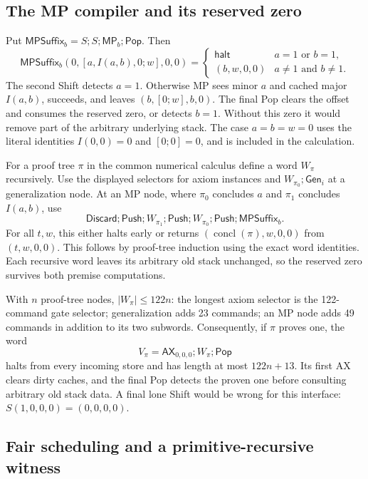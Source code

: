 \subsection{The MP compiler and its reserved zero}

Put $\mathsf{MPSuffix}_b=S;S;\mathsf{MP}_b;\mathsf{Pop}$. Then
\[
 \mathsf{MPSuffix}_b(0,[a,I(a,b),0;w],0,0)=
 \begin{cases}\mathsf{halt}&a=1\text{ or }b=1,\\
 (b,w,0,0)&a\ne1\text{ and }b\ne1.
 \end{cases}
\]
The second Shift detects $a=1$. Otherwise MP sees minor $a$ and cached
major $I(a,b)$, succeeds, and leaves $(b,[0;w],b,0)$. The final Pop
clears the offset and consumes the reserved zero, or detects $b=1$.
Without this zero it would remove part of the arbitrary underlying stack.
The case $a=b=w=0$ uses the literal identities $I(0,0)=0$ and $[0;0]=0$,
and is included in the calculation.

For a proof tree $\pi$ in the common numerical calculus define a word
$W_\pi$ recursively. Use the displayed selectors for axiom instances and
$W_{\pi_0};\mathsf{Gen}_i$ at a generalization node. At an MP node,
where $\pi_0$ concludes $a$ and $\pi_1$ concludes $I(a,b)$, use
\[
 \mathsf{Discard};\mathsf{Push};
 W_{\pi_1};\mathsf{Push};W_{\pi_0};\mathsf{Push};\mathsf{MPSuffix}_b.
\]
For all $t,w$, this either halts early or returns
$(\operatorname{concl}(\pi),w,0,0)$ from $(t,w,0,0)$.
This follows by proof-tree induction using the exact word identities.
Each recursive word leaves its arbitrary old stack unchanged, so the
reserved zero survives both premise computations.

With $n$ proof-tree nodes, $|W_\pi|\le122n$: the longest axiom selector
is the 122-command gate selector; generalization adds 23 commands; an
MP node adds 49 commands in addition to its two subwords. Consequently,
if $\pi$ proves one, the word
\[
 V_\pi=\mathsf{AX}_{0,0,0};W_\pi;\mathsf{Pop}
\]
halts from every incoming store and has length at most $122n+13$.
Its first AX clears dirty caches, and the final Pop detects the proven
one before consulting arbitrary old stack data. A final lone Shift would
be wrong for this interface: $S(1,0,0,0)=(0,0,0,0)$.

\subsection{Fair scheduling and a primitive-recursive witness}

